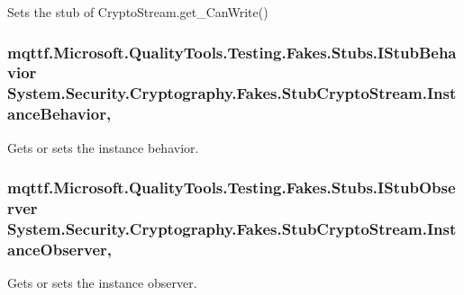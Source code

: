 Sets the stub of Crypto\-Stream.\-get\-\_\-\-Can\-Write()

\hypertarget{class_system_1_1_security_1_1_cryptography_1_1_fakes_1_1_stub_crypto_stream_ab7cafc18bd96965829a94de5e8ae3058}{
\subsubsection[{Instance\-Behavior}]{\setlength{\rightskip}{0pt plus 5cm}mqttf.\-Microsoft.\-Quality\-Tools.\-Testing.\-Fakes.\-Stubs.\-I\-Stub\-Behavior System.\-Security.\-Cryptography.\-Fakes.\-Stub\-Crypto\-Stream.\-Instance\-Behavior\hspace{0.3cm}{\ttfamily [get]}, {\ttfamily [set]}}}\label{class_system_1_1_security_1_1_cryptography_1_1_fakes_1_1_stub_crypto_stream_ab7cafc18bd96965829a94de5e8ae3058}


Gets or sets the instance behavior.

\hypertarget{class_system_1_1_security_1_1_cryptography_1_1_fakes_1_1_stub_crypto_stream_ad9276161def4402f8f5468574d818b51}{
\subsubsection[{Instance\-Observer}]{\setlength{\rightskip}{0pt plus 5cm}mqttf.\-Microsoft.\-Quality\-Tools.\-Testing.\-Fakes.\-Stubs.\-I\-Stub\-Observer System.\-Security.\-Cryptography.\-Fakes.\-Stub\-Crypto\-Stream.\-Instance\-Observer\hspace{0.3cm}{\ttfamily [get]}, {\ttfamily [set]}}}\label{class_system_1_1_security_1_1_cryptography_1_1_fakes_1_1_stub_crypto_stream_ad9276161def4402f8f5468574d818b51}


Gets or sets the instance observer.

